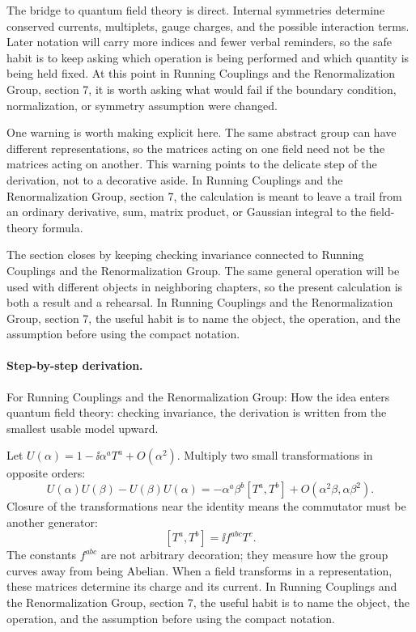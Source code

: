 The bridge to quantum field theory is direct.  Internal symmetries determine conserved currents, multiplets, gauge charges, and the possible interaction terms.  Later notation will carry more indices and fewer verbal reminders, so the safe habit is to keep asking which operation is being performed and which quantity is being held fixed.  At this point in Running Couplings and the Renormalization Group, section 7, it is worth asking what would fail if the boundary condition, normalization, or symmetry assumption were changed.

One warning is worth making explicit here.  The same abstract group can have different representations, so the matrices acting on one field need not be the matrices acting on another.  This warning points to the delicate step of the derivation, not to a decorative aside.  In Running Couplings and the Renormalization Group, section 7, the calculation is meant to leave a trail from an ordinary derivative, sum, matrix product, or Gaussian integral to the field-theory formula.

The section closes by keeping checking invariance connected to Running Couplings and the Renormalization Group.  The same general operation will be used with different objects in neighboring chapters, so the present calculation is both a result and a rehearsal.  In Running Couplings and the Renormalization Group, section 7, the useful habit is to name the object, the operation, and the assumption before using the compact notation.



\paragraph{Step-by-step derivation.}

For Running Couplings and the Renormalization Group: How the idea enters quantum field theory: checking invariance, the derivation is written from the smallest usable model upward.

Let \(U(\alpha)=1-\ii\alpha^aT^a+O(\alpha^2)\).  Multiply two small transformations in opposite orders:
\[
  U(\alpha)U(\beta)-U(\beta)U(\alpha)
  =
  -\alpha^a\beta^b[T^a,T^b]+O(\alpha^2\beta,\alpha\beta^2).
\]
Closure of the transformations near the identity means the commutator must be another generator:
\[
  [T^a,T^b]=\ii f^{abc}T^c.
\]
The constants \(f^{abc}\) are not arbitrary decoration; they measure how the group curves away from being Abelian.  When a field transforms in a representation, these matrices determine its charge and its current.  In Running Couplings and the Renormalization Group, section 7, the useful habit is to name the object, the operation, and the assumption before using the compact notation.

